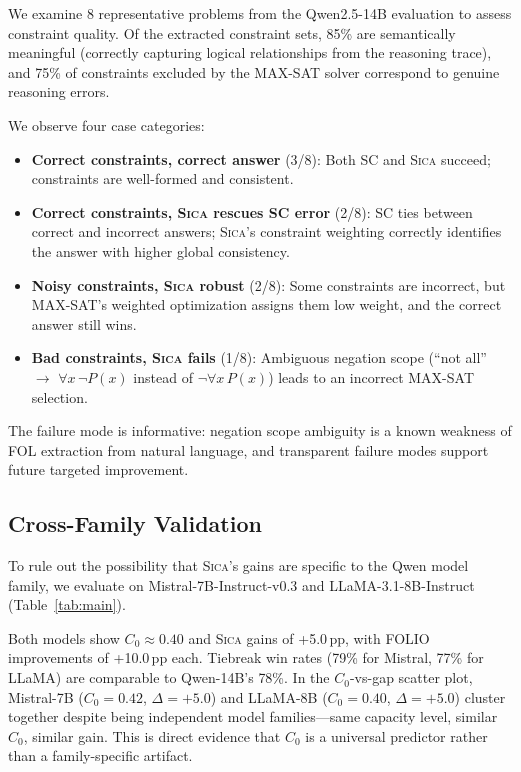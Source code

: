 \documentclass[11pt,a4paper]{article}
\newcommand{\sica}{\textsc{Sica}}
\newcommand{\czero}{C_0}
\begin{document}
We examine 8 representative problems from the Qwen2.5-14B evaluation to assess constraint quality.
Of the extracted constraint sets, 85\% are semantically meaningful (correctly capturing logical relationships from the reasoning trace), and 75\% of constraints excluded by the MAX-SAT solver correspond to genuine reasoning errors.

We observe four case categories:
\begin{itemize}[nosep,leftmargin=*]
  \item \textbf{Correct constraints, correct answer} (3/8): Both SC and \sica{} succeed; constraints are well-formed and consistent.
  \item \textbf{Correct constraints, \sica{} rescues SC error} (2/8): SC ties between correct and incorrect answers; \sica{}'s constraint weighting correctly identifies the answer with higher global consistency.
  \item \textbf{Noisy constraints, \sica{} robust} (2/8): Some constraints are incorrect, but MAX-SAT's weighted optimization assigns them low weight, and the correct answer still wins.
  \item \textbf{Bad constraints, \sica{} fails} (1/8): Ambiguous negation scope (``not all'' $\to$ $\forall x\,\neg P(x)$ instead of $\neg\forall x\, P(x)$) leads to an incorrect MAX-SAT selection.
\end{itemize}

The failure mode is informative: negation scope ambiguity is a known weakness of FOL extraction from natural language, and transparent failure modes support future targeted improvement.


\subsection{Cross-Family Validation}
\label{sec:crossfamily}

To rule out the possibility that \sica{}'s gains are specific to the Qwen model family, we evaluate on Mistral-7B-Instruct-v0.3 and LLaMA-3.1-8B-Instruct (Table~\ref{tab:main}).

Both models show $\czero{} \approx 0.40$ and \sica{} gains of +5.0\,pp, with FOLIO improvements of +10.0\,pp each.
Tiebreak win rates (79\% for Mistral, 77\% for LLaMA) are comparable to Qwen-14B's 78\%.
In the $\czero{}$-vs-gap scatter plot, Mistral-7B ($\czero{}{=}0.42$, $\Delta{=}+5.0$) and LLaMA-8B ($\czero{}{=}0.40$, $\Delta{=}+5.0$) cluster together despite being independent model families---same capacity level, similar $\czero{}$, similar gain.
This is direct evidence that $\czero{}$ is a universal predictor rather than a family-specific artifact.
\end{document}
